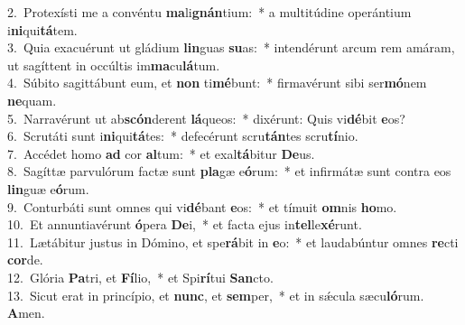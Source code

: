 {2.~}Protexísti me a convéntu \textbf{ma}li\textbf{gnán}tium:~* a multitúdine operántium i\textbf{ni}qui\textbf{tá}tem.\\
{3.~}Quia exacuérunt ut gládium \textbf{lin}guas \textbf{su}as:~* intendérunt arcum rem amáram, ut sagíttent in occúltis im\textbf{ma}cu\textbf{lá}tum.\\
{4.~}Súbito sagittábunt eum, et \textbf{non} ti\textbf{mé}bunt:~* firmavérunt sibi ser\textbf{mó}nem \textbf{ne}quam.\\
{5.~}Narravérunt ut ab\textbf{scón}derent \textbf{lá}queos:~* dixérunt: Quis vi\textbf{dé}bit \textbf{e}os?\\
{6.~}Scrutáti sunt i\textbf{ni}qui\textbf{tá}tes:~* defecérunt scru\textbf{tán}tes scru\textbf{tí}nio.\\
{7.~}Accédet homo \textbf{ad} cor \textbf{al}tum:~* et exal\textbf{tá}bitur \textbf{De}us.\\
{8.~}Sagíttæ parvulórum factæ sunt \textbf{pla}gæ e\textbf{ó}rum:~* et infirmátæ sunt contra eos \textbf{lin}guæ e\textbf{ó}rum.\\
{9.~}Conturbáti sunt omnes qui vi\textbf{dé}bant \textbf{e}os:~* et tímuit \textbf{om}nis \textbf{ho}mo.\\
{10.~}Et annuntiavérunt \textbf{ó}pera \textbf{De}i,~* et facta ejus in\textbf{tel}le\textbf{xé}runt.\\
{11.~}Lætábitur justus in Dómino, et spe\textbf{rá}bit in \textbf{e}o:~* et laudabúntur omnes \textbf{re}cti \textbf{cor}de.\\
{12.~}Glória \textbf{Pa}tri, et \textbf{Fí}lio,~* et Spi\textbf{rí}tui \textbf{San}cto.\\
{13.~}Sicut erat in princípio, et \textbf{nunc}, et \textbf{sem}per,~* et in sǽcula sæcu\textbf{ló}rum. \textbf{A}men.\\
